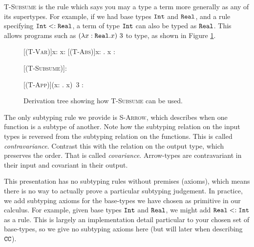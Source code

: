 \textsc{T-Subsume} is the rule which says you may a type a term more generally as any of its supertypes. For example, if we had base types $\mathtt{Int}$ and $\mathtt{Real}$, and a rule specifying $\mathtt{Int} <: \mathtt{Real}$, a term of type $\mathtt{Int}$ can also be typed as $\mathtt{Real}$. This allows programs such as $(\lambda x: \mathtt{Real}. x)~3$ to type, as shown in Figure \ref{fig:subsume}.

\begin{figure}[h]


    \begin{prooftree*}
        [\textsc{(T-Var)}]{x: \Real \vdash x: \Real}
        [\textsc{(T-Abs)}]{\vdash \lambda x: \Real . x : \Real \rightarrow \Real }
        
        \Hypo{\Int <: \Real}
        [\textsc{(T-Subsume)}]{: \Real}
        
        [\textsc{(T-App)}]{\vdash (\lambda x: \Real . x)~3 : \Real}
 	\end{prooftree*}
 	
\vspace{-12pt}
\caption{Derivation tree showing how \textsc{T-Subsume} can be used.}
\label{fig:subsume}
\end{figure}
 


The only subtyping rule we provide is \textsc{S-Arrow}, which describes when one function is a subtype of another. Note how the subtyping relation on the input types is reversed from the subtyping relation on the functions. This is called \textit{contravariance}. Contrast this with the relation on the output type, which preserves the order. That is called \textit{covariance}. Arrow-types are contravariant in their input and covariant in their output.

This presentation has no subtyping rules without premises (axioms), which means there is no way to actually prove a particular subtyping judgement. In practice, we add subtyping axioms for the base-types we have chosen as primitive in our calculus. For example, given base types $\mathtt{Int}$ and $\mathtt{Real}$, we might add $\mathtt{Real} <: \mathtt{Int}$ as a rule. This is largely an implementation detail particular to your chosen set of base-types, so we give no subtyping axioms here (but will later when describing $\mathtt{CC}$).

